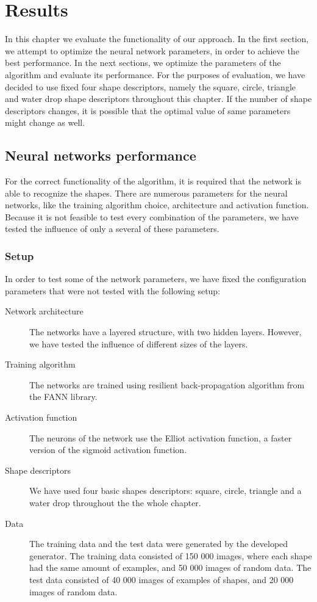 \chapter{Results}
In this chapter we evaluate the functionality of our approach. In the first section, we attempt to optimize the neural network parameters, in order to achieve the best performance. In the next sections, we optimize the parameters of the algorithm and evaluate its performance. For the purposes of evaluation, we have decided to use fixed four shape descriptors, namely the square, circle, triangle and water drop shape descriptors throughout this chapter. If the number of shape descriptors changes, it is possible that the optimal value of same parameters might change as well. 

\section{Neural networks performance}
For the correct functionality of the algorithm, it is required that the network is able to recognize the shapes. There are numerous parameters for the neural networks, like the training algorithm choice, architecture and activation function. Because it is not feasible to test every combination of the parameters, we have tested the influence of only a several of these parameters.

\subsection{Setup}
In order to test some of the network parameters, we have fixed the configuration parameters that were not tested with the following setup:
\begin{description}
\item [Network architecture] The networks have a layered structure, with two hidden layers. However, we have tested the influence of different sizes of the layers.
\item [Training algorithm] The networks are trained using resilient back-propagation algorithm from the FANN library.
\item [Activation function] The neurons of the network use the Elliot activation function, a faster version of the sigmoid activation function.
\item [Shape descriptors] We have used four basic shapes descriptors: square, circle, triangle and a water drop throughout the the whole chapter. 
\item [Data] The training data and the test data were generated by the developed generator. The training data consisted of 150 000 images, where each shape had the same amount of examples, and 50 000 images of random data. The test data consisted of 40 000 images of examples of shapes, and 20 000 images of random data.
\end{description}

